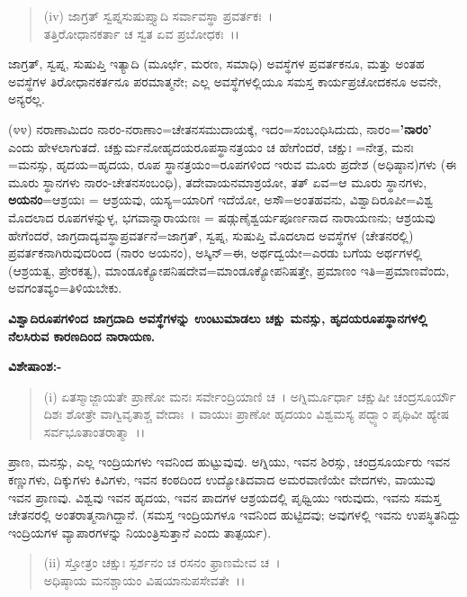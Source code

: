 \begin{verse}
(iv) ಜಾಗ್ರತ್ ಸ್ವಪ್ನಸುಷುಪ್ತ್ಯಾದಿ ಸರ್ವಾವಸ್ಥಾ ಪ್ರವರ್ತಕಃ~।\\ ತತ್ತಿರೋಧಾನಕರ್ತಾ ಚ ಸ್ವತ ಏವ ಪ್ರಬೋಧಕಃ~।।
\end{verse}


ಜಾಗ್ರತ್, ಸ್ವಪ್ನ, ಸುಷುಪ್ತಿ ಇತ್ಯಾದಿ (ಮೂರ್ಛೆ, ಮರಣ, ಸಮಾಧಿ) ಅವಸ್ಥೆಗಳ ಪ್ರವರ್ತಕನೂ, ಮತ್ತು ಅಂತಹ ಅವಸ್ಥೆಗಳ ತಿರೋಧಾನಕರ್ತನೂ ಪರಮಾತ್ಮನೇ; ಎಲ್ಲ ಅವಸ್ಥೆಗಳಲ್ಲಿಯೂ ಸಮಸ್ತ ಕಾರ್ಯಪ್ರಚೋದಕನೂ ಅವನೇ, ಅನ್ಯರಲ್ಲ.

(೪೪) ನರಾಣಾಮಿದಂ ನಾರಂ-ನರಾಣಾಂ=ಚೇತನಸಮುದಾಯಕ್ಕೆ, ಇದಂ=ಸಂಬಂಧಿಸಿದುದು, ನಾರಂ=\textbf{'ನಾರಂ'} ಎಂದು ಹೇಳಲಾಗುತದೆ. ಚಕ್ಷುರ್ಮನೋಹೃದಯರೂಪಸ್ಥಾನತ್ರಯಂ ಚ ಹೇಗೆಂದರೆ, ಚಕ್ಷುಃ =ನೇತ್ರ, ಮನಃ =ಮನಸ್ಸು, ಹೃದಯ=ಹೃದಯ, ರೂಪ ಸ್ಥಾನತ್ರಯಂ=ರೂಪಗಳಿಂದ ಇರುವ ಮೂರು ಪ್ರದೇಶ (ಅಧಿಷ್ಠಾನ)ಗಳು (ಈ ಮೂರು ಸ್ಥಾನಗಳು ನಾರಂ-ಚೇತನಸಂಬಂಧಿ), ತದೇವಾಯನಮಾಶ್ರಯೋ, ತತ್ ಏವ=ಆ ಮೂರು ಸ್ಥಾನಗಳು, \textbf{ಅಯನಂ}=ಆಶ್ರಯಃ = ಆಶ್ರಯವು, ಯಸ್ಯ=ಯಾರಿಗೆ ಇದೆಯೋ, ಅಸೌ=ಅಂತಹವನು, ವಿಶ್ವಾದಿರೂಪೀ=ವಿಶ್ವ ಮೊದಲಾದ ರೂಪಗಳನ್ನುಳ್ಳ, ಭಗವಾನ್ನಾರಾಯಣಃ = ಷಡ್ಗುಣೈಶ್ವರ್ಯಪೂರ್ಣನಾದ ನಾರಾಯಣನು; ಆಶ್ರಯವು ಹೇಗೆಂದರೆ, ಜಾಗ್ರದಾದ್ಯವಸ್ಥಾಪ್ರವರ್ತನೆ=ಜಾಗ್ರತ್, ಸ್ವಪ್ನ, ಸುಷುಪ್ತಿ ಮೊದಲಾದ ಅವಸ್ಥೆಗಳ (ಚೇತನರಲ್ಲಿ) ಪ್ರವರ್ತಕನಾಗಿರುವುದರಿಂದ (ನಾರಂ ಅಯನಂ), ಅಸ್ಕಿನ್=ಈ, ಅರ್ಥದ್ವಯೇ=ಎರಡು ಬಗೆಯ ಅರ್ಥಗಳಲ್ಲಿ (ಆಶ್ರಯತ್ವ, ಪ್ರೇರಕತ್ವ), ಮಾಂಡೂಕ್ಯೋಪನಿಷದೇವ=ಮಾಂಡೂಕ್ಯೋಪನಿಷತ್ತೇ, ಪ್ರಮಾಣಂ ಇತಿ=ಪ್ರಮಾಣವೆಂದು, ಅವಗಂತವ್ಯಂ=ತಿಳಿಯಬೇಕು.

\begin{center}
\textbf{ವಿಶ್ವಾದಿರೂಪಗಳಿಂದ ಜಾಗ್ರದಾದಿ ಅವಸ್ಥೆಗಳನ್ನು ಉಂಟುಮಾಡಲು ಚಕ್ಷು ಮನಸ್ಸು, ಹೃದಯರೂಪಸ್ಥಾನಗಳಲ್ಲಿ ನೆಲಸಿರುವ ಕಾರಣದಿಂದ ನಾರಾಯಣ.}
\end{center}

\noindent
\textbf{ವಿಶೇಷಾಂಶ:-}

\begin{verse}
(i) ಏತಸ್ಮಾಜ್ಜಾಯತೇ ಪ್ರಾಣೋ ಮನಃ ಸರ್ವೇಂದ್ರಿಯಾಣಿ ಚ~। ಅಗ್ನಿರ್ಮೂರ್ಧಾ ಚಕ್ಷುಷೀ ಚಂದ್ರಸೂರ್ಯೌ ದಿಶಃ ಶೋತ್ರೇ ವಾಗ್ವಿವೃತಾಶ್ಚ ವೇದಾಃ~। ವಾಯುಃ ಪ್ರಾಣೋ ಹೃದಯಂ ವಿಶ್ವಮಸ್ಯ ಪದ್ಭ್ಯಾಂ ಪೃಥಿವೀ ಹ್ಯೇಷ ಸರ್ವಭೂತಾಂತರಾತ್ಮಾ~।।
\end{verse}


ಪ್ರಾಣ, ಮನಸ್ಸು, ಎಲ್ಲ ಇಂದ್ರಿಯಗಳು ಇವನಿಂದ ಹುಟ್ಟುವುವು. ಅಗ್ನಿಯು, ಇವನ ಶಿರಸ್ಸು, ಚಂದ್ರಸೂರ್ಯರು ಇವನ ಕಣ್ಣುಗಳು, ದಿಕ್ಕುಗಳು ಕಿವಿಗಳು, ಇವನ ಕಂಠದಿಂದ ಉದ್ಯೋತಿದವಾದ ಅಮರವಾಣಿಯೇ ವೇದಗಳು, ವಾಯುವು ಇವನ ಪ್ರಾಣವು. ವಿಶ್ವವು ಇವನ ಹೃದಯ, ಇವನ ಪಾದಗಳ ಆಶ್ರಯದಲ್ಲಿ ಪೃಥ್ವಿಯು ಇರುವುದು, ಇವನು ಸಮಸ್ತ ಚೇತನರಲ್ಲಿ ಅಂತರಾತ್ಮನಾಗಿದ್ದಾನೆ. (ಸಮಸ್ತ ಇಂದ್ರಿಯಗಳೂ ಇವನಿಂದ ಹುಟ್ಟಿದವು; ಅವುಗಳಲ್ಲಿ ಇವನು ಉಪಸ್ಥಿತನಿದ್ದು ಇಂದ್ರಿಯಗಳ ವ್ಯಾಪಾರಗಳನ್ನು ನಿಯಂತ್ರಿಸುತ್ತಾನೆ ಎಂದು ತಾತ್ಪರ್ಯ).

\begin{verse}
(ii) ಸ್ತೋತ್ರಂ ಚಕ್ಷುಃ ಸ್ಪರ್ಶನಂ ಚ ರಸನಂ ಫ್ರಾಣಮೇವ ಚ~।\\ ಅಧಿಷ್ಠಾಯ ಮನಶ್ಚಾಯಂ ವಿಷಯಾನುಪಸೇವತೇ~।।
\end{verse}

